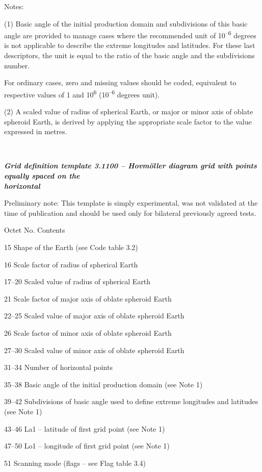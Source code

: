 Notes:

(1) Basic angle of the initial production domain and subdivisions of this basic angle are provided to manage cases where the recommended unit of 10\textsuperscript{--6} degrees is not applicable to describe the extreme longitudes and latitudes. For these last descriptors, the unit is equal to the ratio of the basic angle and the subdivisions number.

For ordinary cases, zero and missing values should be coded, equivalent to respective values of 1 and 10\textsuperscript{6} (10\textsuperscript{--6} degrees unit).

(2) A scaled value of radius of spherical Earth, or major or minor axis of oblate spheroid Earth, is derived by applying the appropriate scale factor to the value expressed in metres.

\textbf{\\
}

\emph{\textbf{Grid definition template 3.1100 -- Hovmöller diagram grid with points equally spaced on the\\
horizontal}}

Preliminary note: This template is simply experimental, was not validated at the time of publication and should be used only for bilateral previously agreed tests.

Octet No. Contents

15 Shape of the Earth (see Code table 3.2)

16 Scale factor of radius of spherical Earth

17--20 Scaled value of radius of spherical Earth

21 Scale factor of major axis of oblate spheroid Earth

22--25 Scaled value of major axis of oblate spheroid Earth

26 Scale factor of minor axis of oblate spheroid Earth

27--30 Scaled value of minor axis of oblate spheroid Earth

31--34 Number of horizontal points

35--38 Basic angle of the initial production domain (see Note 1)

39--42 Subdivisions of basic angle used to define extreme longitudes and latitudes (see Note 1)

43--46 La1 -- latitude of first grid point (see Note 1)

47--50 Lo1 -- longitude of first grid point (see Note 1)

51 Scanning mode (flags -- see Flag table 3.4)

